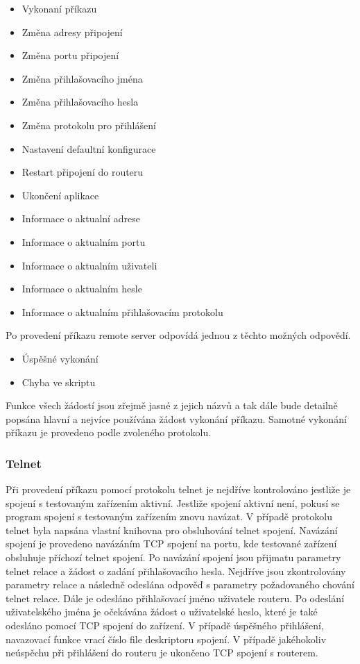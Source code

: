 \begin{itemize}
  \item Vykonaní příkazu
  \item Změna adresy připojení
  \item Změna portu připojení
  \item Změna přihlašovacího jména
  \item Změna přihlašovacího hesla
  \item Změna protokolu pro přihlášení
  \item Nastavení defaultní konfigurace
  \item Restart připojení do routeru
  \item Ukončení aplikace
  \item Informace o aktualní adrese
  \item Informace o aktualním portu
  \item Informace o aktualním uživateli
  \item Informace o aktualním hesle
  \item Informace o aktualním přihlašovacím protokolu
\end{itemize}

Po provedení příkazu remote server odpovídá jednou z těchto možných odpovědí.

\begin{itemize}
  \item Úspěšné vykonání
  \item Chyba ve skriptu
\end{itemize}

Funkce všech žádostí jsou zřejmě jasné z jejich názvů a tak dále bude detailně popsána hlavní a nejvíce používána žádost vykonání příkazu. Samotné vykonání příkazu je provedeno podle zvoleného protokolu.

\subsubsection{Telnet}
Při provedení příkazu pomocí protokolu telnet je nejdříve kontrolováno jestliže je spojení s testovaným zařízením aktivní. Jestliže spojení aktivní není, pokusí se program spojení s testovaným zařízením znovu navázat. V případě protokolu telnet byla napsána vlastní knihovna pro obsluhování telnet spojení. Navázání spojení je provedeno navázáním TCP spojení na portu, kde testované zařízení obsluhuje příchozí telnet spojení. Po navázání spojení jsou přijmatu parametry telnet relace a žádost o zadání přihlašovacího hesla. Nejdříve jsou zkontrolovány parametry relace a následně odeslána odpověď s parametry požadovaného chování telnet relace. Dále je odesláno přihlašovací jméno uživatele routeru. Po odeslání uživatelského jména je očekávána žádost o uživatelské heslo, které je také odesláno pomocí TCP spojení do zařízení. V případě úspěšného přihlášení, navazovací funkce vrací číslo file deskriptoru spojení. V případě jakéhokoliv neúspěchu při přihlášení do routeru je ukončeno TCP spojení s routerem.

